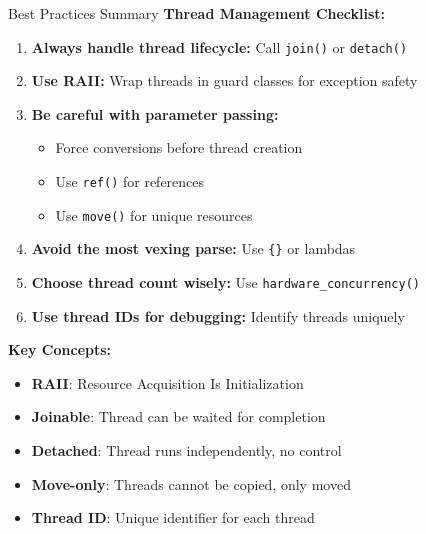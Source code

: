 \begin{frame}[fragile]{ Best Practices Summary}
	\textbf{Thread Management Checklist:}

	\begin{enumerate}
		\item \textbf{Always handle thread lifecycle:} Call \texttt{join()} or \texttt{detach()}
		\item \textbf{Use RAII:} Wrap threads in guard classes for exception safety
		\item \textbf{Be careful with parameter passing:}
		      \begin{itemize}
			      \item Force conversions before thread creation
			      \item Use \texttt{ref()} for references
			      \item Use \texttt{move()} for unique resources
		      \end{itemize}
		\item \textbf{Avoid the most vexing parse:} Use \texttt{\{\}} or lambdas
		\item \textbf{Choose thread count wisely:} Use \texttt{hardware\_concurrency()}
		\item \textbf{Use thread IDs for debugging:} Identify threads uniquely
	\end{enumerate}

	\vspace{1em}
	\textbf{Key Concepts:}
	\begin{itemize}
		\item \textbf{RAII}: Resource Acquisition Is Initialization
		\item \textbf{Joinable}: Thread can be waited for completion
		\item \textbf{Detached}: Thread runs independently, no control
		\item \textbf{Move-only}: Threads cannot be copied, only moved
		\item \textbf{Thread ID}: Unique identifier for each thread
	\end{itemize}
\end{frame}
